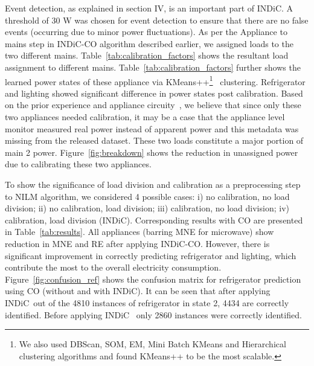 \documentclass[conference]{IEEEtran}
\newcommand{\figref}[1]{Figure~\ref{#1}}
\newcommand{\tabref}[1]{Table~\ref{#1}}
\newcommand{\indic}{INDiC~}
\newcommand{\indicns}{INDiC}
\begin{document}
\noindent Event detection, as explained in section IV, is an important part of \indicns. A threshold of 30 W was chosen for event detection to ensure that there are no false events (occurring due to minor power fluctuations). As per the Appliance to mains step in \indicns-CO algorithm described earlier, we assigned loads to the two different mains. \tabref{tab:calibration_factors} shows the resultant load assignment to different mains. \tabref{tab:calibration_factors} further shows the learned power states of these appliance via KMeans++\footnote{We also used DBScan, SOM, EM, Mini Batch KMeans and Hierarchical clustering algorithms and found KMeans++ to be the most scalable.}~\cite{kmeansplusplus} clustering. Refrigerator and lighting showed significant difference in power states post calibration. Based on the prior experience and appliance circuity~\cite{ting2005}, we believe that since only these two appliances needed calibration, it may be a case that the appliance level monitor measured real power instead of apparent power and this metadata was missing from the released dataset. These two loads constitute a major portion of main 2 power. \figref{fig:breakdown} shows the reduction in unassigned power due to calibrating these two appliances. 

\noindent To show the significance of load division and calibration as a preprocessing step to NILM algorithm, we considered 4 possible cases:  i) no calibration, no load division; ii) no calibration, load division; iii) calibration, no load division; iv) calibration, load division (\indicns). Corresponding results with CO are presented in \tabref{tab:results}.
  All appliances (barring MNE for microwave) show reduction in MNE and RE after applying \indicns-CO. However, there is significant improvement in correctly predicting refrigerator and lighting, which contribute the most to the overall electricity consumption. \figref{fig:confusion_ref} shows the confusion matrix for refrigerator prediction using CO (without and with \indicns). It can be seen that after applying \indic out of the 4810 instances of refrigerator in state 2, 4434 are correctly identified. Before applying \indic
only 2860 instances were correctly identified.
%
\end{document}
